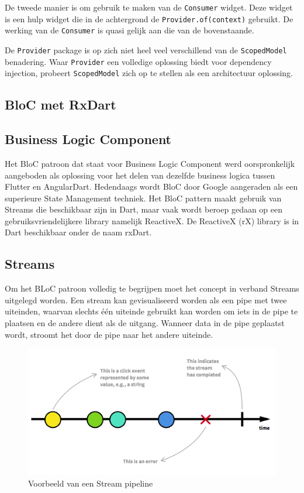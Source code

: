 De tweede manier is om gebruik te maken van de \verb|Consumer| widget. Deze widget is een hulp widget die in de achtergrond de \verb|Provider.of(context)| gebruikt. De werking van de \verb|Consumer| is quasi gelijk aan die van de bovenstaande. 

De \verb|Provider| package is op zich niet heel veel verschillend van de \verb|ScopedModel| benadering. Waar \verb|Provider| een volledige oplossing biedt voor dependency injection, probeert \verb|ScopedModel| zich op te stellen als een architectuur oplossing.

\subsection{BloC met RxDart}
\subsection*{Business Logic Component}
Het BloC patroon dat staat voor Business Logic Component werd oorspronkelijk aangeboden als oplossing voor het delen van dezelfde business logica tussen Flutter en AngularDart. Hedendaags wordt BloC door Google aangeraden als een superieure State Management techniek. Het BloC pattern maakt gebruik van Streams die beschikbaar zijn in Dart, maar vaak wordt beroep gedaan op een gebruiksvriendelijkere library namelijk ReactiveX.
\newline
De ReactiveX (rX) library is in Dart beschikbaar onder de naam rxDart.

\subsection*{Streams}
Om het BLoC patroon volledig te begrijpen moet het concept in verband Streams uitgelegd worden.
Een stream kan gevisualiseerd worden als een pipe met twee uiteinden, waarvan slechts
één uiteinde gebruikt kan worden om iets in de pipe te plaatsen en de andere dient als de uitgang. Wanneer data in de pipe
geplaatst wordt, stroomt het door de pipe naar het andere uiteinde. \autocite{Boelens2018}

\begin{figure}[H]
    \centering
    \includegraphics[width=\figureWidthModifier\linewidth]{img/stand-van-zaken/stream-pipeline.png}
    \caption{Voorbeeld van een Stream pipeline}
    \label{fig:stream-pipeline}
\end{figure}

